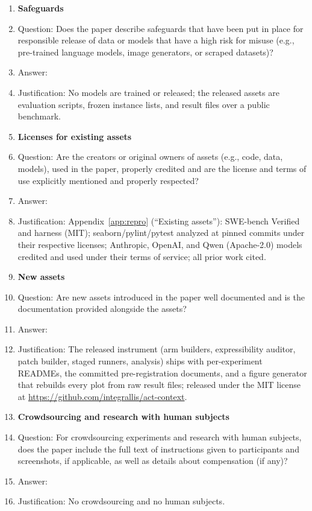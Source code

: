 \begin{enumerate}
\item {\bf Safeguards}
    \item[] Question: Does the paper describe safeguards that have been put in place for responsible release of data or models that have a high risk for misuse (e.g., pre-trained language models, image generators, or scraped datasets)?
    \item[] Answer: \answerNA{}
    \item[] Justification: No models are trained or released; the released assets are evaluation scripts, frozen instance lists, and result files over a public benchmark.

\item {\bf Licenses for existing assets}
    \item[] Question: Are the creators or original owners of assets (e.g., code, data, models), used in the paper, properly credited and are the license and terms of use explicitly mentioned and properly respected?
    \item[] Answer: \answerYes{}
    \item[] Justification: Appendix~\ref{app:repro} (``Existing assets''): SWE-bench Verified and harness \citep{swebench} (MIT); seaborn/pylint/pytest analyzed at pinned commits under their respective licenses; Anthropic, OpenAI, and Qwen (Apache-2.0) models credited and used under their terms of service; all prior work cited.

\item {\bf New assets}
    \item[] Question: Are new assets introduced in the paper well documented and is the documentation provided alongside the assets?
    \item[] Answer: \answerYes{}
    \item[] Justification: The released instrument (arm builders, expressibility auditor, patch builder, staged runners, analysis) ships with per-experiment READMEs, the committed pre-registration documents, and a figure generator that rebuilds every plot from raw result files; released under the MIT license at \url{https://github.com/integrallis/act-context}.

\item {\bf Crowdsourcing and research with human subjects}
    \item[] Question: For crowdsourcing experiments and research with human subjects, does the paper include the full text of instructions given to participants and screenshots, if applicable, as well as details about compensation (if any)?
    \item[] Answer: \answerNA{}
    \item[] Justification: No crowdsourcing and no human subjects.


\end{enumerate}
